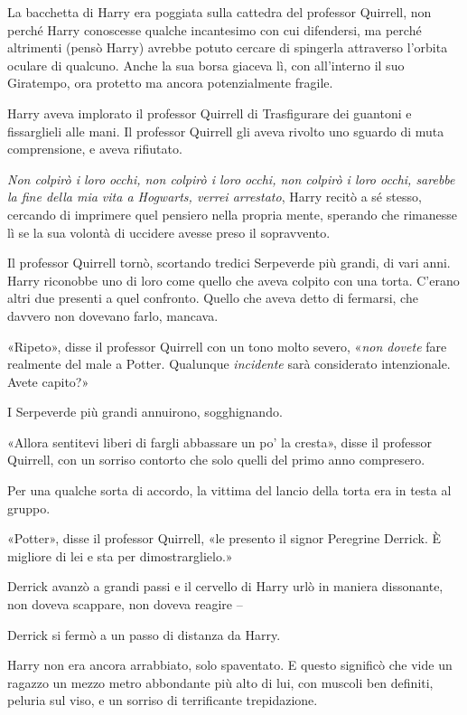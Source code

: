 La bacchetta di Harry era poggiata sulla cattedra del professor Quirrell, non perché Harry conoscesse qualche incantesimo con cui difendersi, ma perché altrimenti (pensò Harry) avrebbe potuto cercare di spingerla attraverso l’orbita oculare di qualcuno. Anche la sua borsa giaceva lì, con all’interno il suo Giratempo, ora protetto ma ancora potenzialmente fragile.

Harry aveva implorato il professor Quirrell di Trasfigurare dei guantoni e fissarglieli alle mani. Il professor Quirrell gli aveva rivolto uno sguardo di muta comprensione, e aveva rifiutato.

\textit{Non colpirò i loro occhi, non colpirò i loro occhi, non colpirò i loro occhi, sarebbe la fine della mia vita a Hogwarts, verrei arrestato}, Harry recitò a sé stesso, cercando di imprimere quel pensiero nella propria mente, sperando che rimanesse lì se la sua volontà di uccidere avesse preso il sopravvento.

Il professor Quirrell tornò, scortando tredici Serpeverde più grandi, di vari anni. Harry riconobbe uno di loro come quello che aveva colpito con una torta. C’erano altri due presenti a quel confronto. Quello che aveva detto di fermarsi, che davvero non dovevano farlo, mancava.

«Ripeto», disse il professor Quirrell con un tono molto severo, «\textit{non dovete} fare realmente del male a Potter. Qualunque \textit{incidente} sarà considerato intenzionale. Avete capito?»

I Serpeverde più grandi annuirono, sogghignando.

«Allora sentitevi liberi di fargli abbassare un po’ la cresta», disse il professor Quirrell, con un sorriso contorto che solo quelli del primo anno compresero.

Per una qualche sorta di accordo, la vittima del lancio della torta era in testa al gruppo.

«Potter», disse il professor Quirrell, «le presento il signor Peregrine Derrick. È migliore di lei e sta per dimostrarglielo.»

Derrick avanzò a grandi passi e il cervello di Harry urlò in maniera dissonante, non doveva scappare, non doveva reagire –

Derrick si fermò a un passo di distanza da Harry.

Harry non era ancora arrabbiato, solo spaventato. E questo significò che vide un ragazzo un mezzo metro abbondante più alto di lui, con muscoli ben definiti, peluria sul viso, e un sorriso di terrificante trepidazione.

